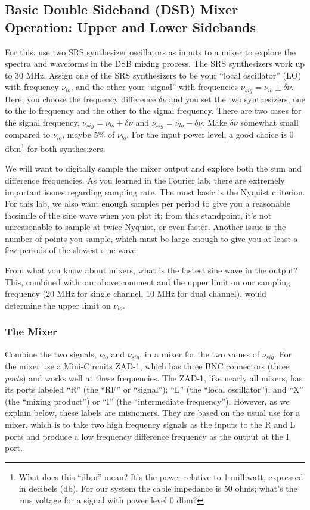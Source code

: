 \documentclass[11pt]{article}
\begin{document}
\subsection{Basic Double Sideband (DSB) Mixer Operation: Upper and Lower Sidebands}
\label{upperlowerdsb}

        For this, use two SRS synthesizer oscillators as inputs to a
mixer to explore the spectra and waveforms in the DSB mixing process.
The SRS synthesizers work up to 30 MHz.  Assign one of the SRS
synthesizers to be your ``local oscillator'' (LO) with frequency
$\nu_{lo}$, and the other your ``signal'' with frequencies $\nu_{sig} =
\nu_{lo} \pm \delta \nu$.  Here, you choose the frequency difference
$\delta \nu$ and you set the two synthesizers, one to the lo
frequency and the other to the signal frequency. There are two cases for
the signal frequency, $\nu_{sig} = \nu_{lo} + \delta \nu$ and
$\nu_{sig} = \nu_{lo} - \delta \nu$.  Make $\delta \nu$ somewhat small
compared to $\nu_{lo}$, maybe $5\%$ of $\nu_{lo}$.  For the input power
level, a good choice is 0 dbm\footnote{What does this ``dbm'' mean? It's
the power relative to 1 milliwatt, expressed in decibels (db). For our
system the cable impedance is 50 ohms; what's the rms voltage for a
signal with power level 0 dbm?} for both synthesizers.

        We will want to digitally sample the mixer output and explore
both the sum and difference frequencies. As you learned in the Fourier
lab, there are extremely important issues regarding sampling rate. The
most basic is the Nyquist criterion. For this lab, we also want enough
samples per period to give you a reasonable facsimile of the sine wave
when you plot it; from this standpoint, it's not unreasonable to sample
at twice Nyquist, or even faster.  Another issue is the number of
points you sample, which must be large enough to give you at least a
few periods of the slowest sine wave.

        From what you know about mixers, what is the fastest sine wave
in the output? This, combined with our above comment and the upper limit
on our sampling frequency (20 MHz for single channel, 10 MHz for dual
channel), would determine the upper limit on $\nu_{lo}$.

\subsubsection{The Mixer}

Combine the two signals, $\nu_{lo}$ and $\nu_{sig}$, in a mixer for the
two values of $\nu_{sig}$.  For the mixer use a Mini-Circuits
ZAD-1, which has three BNC connectors (three {\it ports}) and works well
at these frequencies.  The ZAD-1, like nearly all mixers, has its ports
labeled ``R'' (the ``RF'' or ``signal''); ``L'' (the ``local
oscillator''); and ``X'' (the ``mixing product'') or ``I'' (the
``intermediate frequency'').  However, as we explain below, these labels
are misnomers.  They are based on the usual use for a mixer, which is to
take two high frequency signals as the inputs to the R and L ports and
produce a low frequency difference frequency as the output at the I
port.
\end{document}
